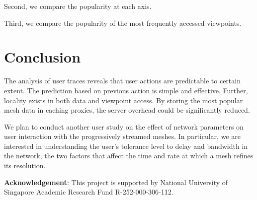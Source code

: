 Second, we compare the popularity at each axis. 

Third, we compare the popularity of the most frequently accessed viewpoints.
\section{Conclusion}
The analysis of user traces reveals that 
user actions are predictable to certain extent. The
prediction based on previous action is simple and effective. 
Further, locality exists in both data and viewpoint access. By
storing the most popular mesh data in caching proxies, 
the server overhead could be significantly reduced. 

We plan to conduct another user study on the effect
of network parameters on user interaction with the progressively
streamed meshes. In particular, we are interested in understanding
the user's tolerance level to delay and bandwidth in the network,
the two factors that affect the time and rate at which a mesh 
refines its resolution.

\textbf{Acknowledgement}:
This project is supported by National University of Singapore Academic
Research Fund R-252-000-306-112.
